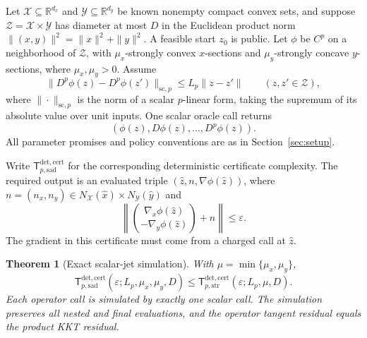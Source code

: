\documentclass[11pt]{article}
\numberwithin{equation}{section}
\newtheorem{theorem}{Theorem}[section]
\theoremstyle{definition}
\theoremstyle{remark}
\newcommand{\R}{\mathbb R}
\newcommand{\Tcert}{\mathsf T_{p,\mathrm{str}}^{\mathrm{det,cert}}}
\begin{document}
Let $\mathcal X\subseteq\R^{d_x}$ and
$\mathcal Y\subseteq\R^{d_y}$ be known nonempty compact convex sets,
and suppose $\mathcal Z=\mathcal X\times\mathcal Y$ has diameter at
most $D$ in the Euclidean product norm
$\|(x,y)\|^2=\|x\|^2+\|y\|^2$. A feasible start $z_0$ is public.
Let $\phi$ be $C^p$ on a neighborhood of $\mathcal Z$, with
$\mu_x$-strongly convex $x$-sections and $\mu_y$-strongly concave
$y$-sections, where $\mu_x,\mu_y>0$. Assume
\begin{equation}\label{eq:scalar-smoothness}
\|D^p\phi(z)-D^p\phi(z')\|_{\mathrm{sc},p}
\le L_p\|z-z'\|
\qquad(z,z'\in\mathcal Z),
\end{equation}
where $\|\cdot\|_{\mathrm{sc},p}$ is the norm of a scalar $p$-linear
form, taking the supremum of its absolute value over unit inputs.
One scalar oracle call returns
\begin{equation}\label{eq:scalar-jet}
(\phi(z),D\phi(z),\ldots,D^p\phi(z)).
\end{equation}
All parameter promises and policy conventions are as in
Section~\ref{sec:setup}.

Write $\mathsf T_{p,\mathrm{sad}}^{\mathrm{det,cert}}$ for the
corresponding deterministic certificate complexity. The required
output is an evaluated triple $(\widehat z,n,\nabla\phi(\widehat z))$,
where $n=(n_x,n_y)\in
N_{\mathcal X}(\widehat x)\times N_{\mathcal Y}(\widehat y)$ and
\begin{equation}\label{eq:saddle-certificate}
\left\|
\binom{\nabla_x\phi(\widehat z)}{-\nabla_y\phi(\widehat z)}+n
\right\|\le\varepsilon.
\end{equation}
The gradient in this certificate must come from a charged call at
$\widehat z$.

\begin{theorem}[Exact scalar-jet simulation]\label{thm:transfer}
With $\mu=\min\{\mu_x,\mu_y\}$,
\begin{equation}\label{eq:scalar-simulation}
\mathsf T_{p,\mathrm{sad}}^{\mathrm{det,cert}}
(\varepsilon;L_p,\mu_x,\mu_y,D)
\le
\Tcert(\varepsilon;L_p,\mu,D).
\end{equation}
Each operator call is simulated by exactly one scalar call. The
simulation preserves all nested and final evaluations, and the
operator tangent residual equals the product KKT residual.
\end{theorem}
\end{document}
